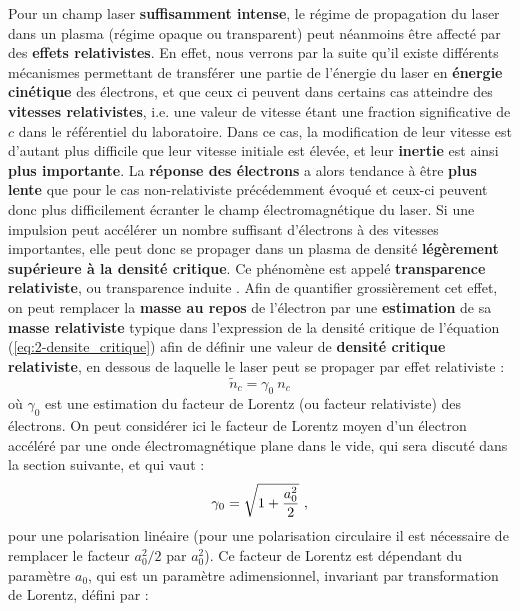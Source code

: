 \begin{refsection}
Pour un champ laser \textbf{suffisamment intense}, le régime de propagation du laser dans un plasma (régime opaque ou transparent) peut néanmoins être affecté par des \textbf{effets relativistes}. 
En effet, nous verrons par la suite qu'il existe différents mécanismes permettant de transférer une partie de l'énergie du laser en \textbf{énergie cinétique} des électrons, et que ceux ci peuvent dans certains cas atteindre des \textbf{vitesses relativistes}, i.e. une valeur de vitesse étant une fraction significative de $c$ dans le référentiel du laboratoire. 
Dans ce cas, la modification de leur vitesse est d'autant plus difficile que leur vitesse initiale est élevée, et leur \textbf{inertie} est ainsi \textbf{plus importante}. La \textbf{réponse des électrons} a alors tendance à être \textbf{plus lente} que pour le cas non-relativiste précédemment évoqué et ceux-ci peuvent donc plus difficilement écranter le champ électromagnétique du laser. Si une impulsion peut accélérer un nombre suffisant d'électrons à des vitesses importantes, elle peut donc se propager dans un plasma de densité \textbf{légèrement supérieure à la densité critique}. Ce phénomène est appelé \textbf{transparence relativiste}, ou transparence induite \parencite{macchi_2012}. Afin de quantifier grossièrement cet effet, on peut remplacer la \textbf{masse au repos} de l'électron par une \textbf{estimation} de sa \textbf{masse relativiste} typique dans l'expression de la densité critique de l'équation (\ref{eq:2-densite_critique}) afin de définir une valeur de \textbf{densité critique relativiste}, en dessous de laquelle le laser peut se propager par effet relativiste :
\begin{equation}
    \tilde{n}_c = \gamma_0 ~ n_c
    \label{eq:2-densite_critique_relativiste}
\end{equation}
où $\gamma_0$ est une estimation du facteur de Lorentz (ou facteur relativiste) des électrons. On peut considérer ici le facteur de Lorentz moyen d'un électron accéléré par une onde électromagnétique plane dans le vide, qui sera discuté dans la section suivante, et qui vaut :
\begin{equation}
    \gamma_0 = \sqrt{1+\dfrac{a_0^2}{2}} ~ \rm ,
\end{equation}
pour une polarisation linéaire (pour une polarisation circulaire il est nécessaire de remplacer le facteur $a_0^2/2$ par $a_0^2$). Ce facteur de Lorentz est dépendant du paramètre $a_0$, qui est un paramètre adimensionnel, invariant par transformation de Lorentz, défini par :
\begin{equation}

\end{equation}
\end{refsection}

